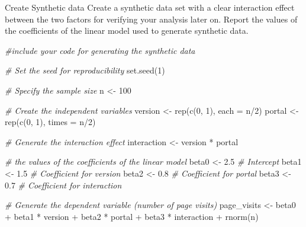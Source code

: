 \documentclass[
  ignorenonframetext,
]{beamer}
\newenvironment{Shaded}{\begin{snugshade}}{\end{snugshade}}
\newcommand{\AttributeTok}[1]{\textcolor[rgb]{0.77,0.63,0.00}{#1}}
\newcommand{\CommentTok}[1]{\textcolor[rgb]{0.56,0.35,0.01}{\textit{#1}}}
\newcommand{\DecValTok}[1]{\textcolor[rgb]{0.00,0.00,0.81}{#1}}
\newcommand{\FloatTok}[1]{\textcolor[rgb]{0.00,0.00,0.81}{#1}}
\newcommand{\FunctionTok}[1]{\textcolor[rgb]{0.00,0.00,0.00}{#1}}
\newcommand{\NormalTok}[1]{#1}
\newcommand{\OtherTok}[1]{\textcolor[rgb]{0.56,0.35,0.01}{#1}}
\newcommand{\SpecialCharTok}[1]{\textcolor[rgb]{0.00,0.00,0.00}{#1}}
\begin{document}
\begin{frame}[fragile]{Create Synthetic data}
\protect\hypertarget{create-synthetic-data}{}
Create a synthetic data set with a clear interaction effect between the
two factors for verifying your analysis later on. Report the values of
the coefficients of the linear model used to generate synthetic data.

\begin{Shaded}
\begin{Highlighting}[]
\CommentTok{\#include your code for generating the synthetic data}

\CommentTok{\# Set the seed for reproducibility}
\FunctionTok{set.seed}\NormalTok{(}\DecValTok{1}\NormalTok{)}

\CommentTok{\# Specify the sample size}
\NormalTok{n }\OtherTok{\textless{}{-}} \DecValTok{100}

\CommentTok{\# Create the independent variables}
\NormalTok{version }\OtherTok{\textless{}{-}} \FunctionTok{rep}\NormalTok{(}\FunctionTok{c}\NormalTok{(}\DecValTok{0}\NormalTok{, }\DecValTok{1}\NormalTok{), }\AttributeTok{each =}\NormalTok{ n}\SpecialCharTok{/}\DecValTok{2}\NormalTok{)}
\NormalTok{portal }\OtherTok{\textless{}{-}} \FunctionTok{rep}\NormalTok{(}\FunctionTok{c}\NormalTok{(}\DecValTok{0}\NormalTok{, }\DecValTok{1}\NormalTok{), }\AttributeTok{times =}\NormalTok{ n}\SpecialCharTok{/}\DecValTok{2}\NormalTok{)}

\CommentTok{\# Generate the interaction effect}
\NormalTok{interaction }\OtherTok{\textless{}{-}}\NormalTok{ version }\SpecialCharTok{*}\NormalTok{ portal}

\CommentTok{\# the values of the coefficients of the linear model}
\NormalTok{beta0 }\OtherTok{\textless{}{-}} \FloatTok{2.5}     \CommentTok{\# Intercept}
\NormalTok{beta1 }\OtherTok{\textless{}{-}} \FloatTok{1.5}     \CommentTok{\# Coefficient for version}
\NormalTok{beta2 }\OtherTok{\textless{}{-}} \FloatTok{0.8}     \CommentTok{\# Coefficient for portal}
\NormalTok{beta3 }\OtherTok{\textless{}{-}} \FloatTok{0.7}     \CommentTok{\# Coefficient for interaction}

\CommentTok{\# Generate the dependent variable (number of page visits)}
\NormalTok{page\_visits }\OtherTok{\textless{}{-}}\NormalTok{ beta0 }\SpecialCharTok{+}\NormalTok{ beta1 }\SpecialCharTok{*}\NormalTok{ version }\SpecialCharTok{+}\NormalTok{ beta2 }\SpecialCharTok{*}\NormalTok{ portal }\SpecialCharTok{+}\NormalTok{ beta3 }\SpecialCharTok{*}\NormalTok{ interaction }\SpecialCharTok{+} \FunctionTok{rnorm}\NormalTok{(n)}


\end{Highlighting}
\end{Shaded}
\end{frame}
\end{document}
